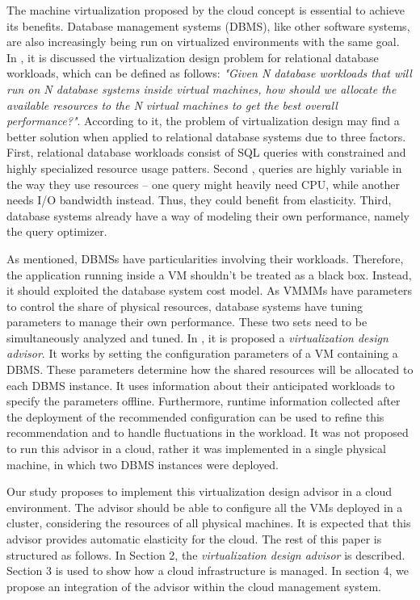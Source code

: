 The machine virtualization proposed by the cloud concept is essential to achieve its benefits. Database management systems (DBMS), like other software systems, are also increasingly being run on virtualized environments with the same goal. In \cite{4401021}, it is discussed the virtualization design problem for relational database workloads, which can be defined as follows: \textit{"Given N database workloads that will run on N database systems inside virtual machines, how should we allocate the available resources to the N virtual machines to get the best overall performance?"}. According to it, the problem of virtualization design may find a better solution when applied to relational database systems due to three factors. First, relational database workloads consist of SQL queries with constrained and highly specialized resource usage patters. Second , queries are highly variable in the way they use resources -- one query might heavily need CPU, while another needs I/O bandwidth instead. Thus, they could benefit from elasticity. Third, database systems already have a way of modeling their own performance, namely the query optimizer.

As mentioned, DBMSs have particularities involving their workloads. Therefore, the application running inside a VM shouldn't be treated as a black box. Instead, it should exploited the database system cost model. As VMMMs have parameters to control the share of physical resources, database systems have tuning parameters to manage their own performance. These two sets need to be simultaneously analyzed and tuned. In \cite{Soror:2008:AVM:1376616.1376711}, it is proposed a \textit{virtualization design advisor}. It works by setting the configuration parameters of a VM containing a DBMS. These parameters determine how the shared resources will be allocated to each  DBMS instance. It uses information about their anticipated workloads to specify the parameters offline. Furthermore, runtime information collected after the deployment of the recommended configuration can be used to refine this recommendation and to handle fluctuations in the workload. It was not proposed to run this advisor in a cloud, rather it was implemented in a single physical machine, in which two DBMS instances were deployed.

Our study proposes to implement this virtualization design advisor in a cloud environment. The advisor should be able to configure all the VMs deployed in a cluster, considering the resources of all physical machines. It is expected that this advisor provides automatic elasticity for the cloud. The rest of this paper is structured as follows. In Section 2, the \textit{virtualization design advisor} is described. Section 3 is used to show how a cloud infrastructure is managed. In section 4, we propose an integration of the advisor within the cloud management system.

